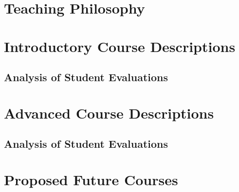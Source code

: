 \documentclass[../main.tex]{subfiles}
\begin{document}
\section{Teaching Philosophy}

\begin{flushleft}

\end{flushleft}

\section{Introductory Course Descriptions}

\begin{flushleft}

\end{flushleft}

\subsection{Analysis of Student Evaluations}

\begin{flushleft}

\end{flushleft}

\section{Advanced Course Descriptions}

\begin{flushleft}

\end{flushleft}

\subsection{Analysis of Student Evaluations}

\begin{flushleft}

\end{flushleft}

\section{Proposed Future Courses}

\begin{flushleft}

\end{flushleft}

%
%
\end{document}

